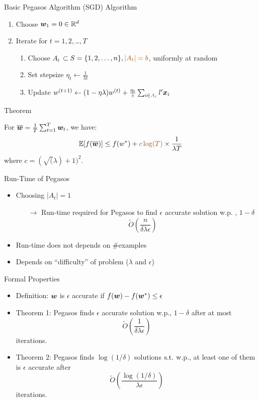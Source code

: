 \begin{frame}{Basic Pegasos Algorithm (SGD)}
    {\color{blue} Algorithm}

    \begin{enumerate} 
        \item Choose $\bm{w}_1 = 0 \in \mathbb{R}^d$
        \item Iterate for $t = 1,2,$\ldots$,T$
        \begin{enumerate}
            \item Choose {\color{red} $A_t$} $\subset S = \{1,2,\ldots,n\},{\color{red}|A_t|=b}$, uniformly at random
            \item Set stepsize $\eta_t \leftarrow \frac{1}{\lambda t}$
            \item Update $w^{(t+1)} \leftarrow (1-\eta\lambda)w^{(t)} + \frac{\eta_t}{\color{red}b} \sum_{i\in {\color{red} A_t}} l' \xv_i$
        \end{enumerate}
    \end{enumerate}

    {\color{blue} Theorem}

    For $\overline{\bm{w}} = \frac1T \sum_{t=1}^T \bm{w}_t $, we have:
    \[
        \E[f(\overline{\wv})]\le f(w^*) + {\color{red} c\log(T)}\times \frac{1}{\lambda T}
    \]
    where $c=(\sqrt(\lambda)+1)^2$.
\end{frame}

\begin{frame}{Run-Time of Pegasos}
    \begin{itemize}
        \item Choosing $|A_t|=1$%
            \begin{itemize}
                \item[$\rightarrow$] Run-time required for Pegasos to find $\epsilon$ accurate solution w.p. , $1-\delta$
            \[
                \tilde{O}(\frac{n}{\delta \lambda \epsilon})
            \]
            \end{itemize}
        \item Run-time does not depends on \#examples
        \item Depends on ``difficulty'' of problem ($\lambda$ and $\epsilon$)
    \end{itemize}
\end{frame}

\begin{frame}{Formal Properties}
    \begin{itemize}
        \item Definition: $\bm{w}$ is $\epsilon$ accurate if $f(\bm{w})-f(\bm{w}^*)\le \epsilon$
        \item Theorem 1: Pegasos finds $\epsilon$ accurate solution w.p., $1-\delta$ after at most
            \[
                \tilde{O}(\frac{1}{\delta \lambda \epsilon})
            \]
            iterations.
        \item Theorem 2: Pegasos finds $\log(1/\delta)$ solutions $\operatorname{\textrm{s.t.}}$ w.p., at least one of them is $\epsilon$ accurate after 
            \[
                \tilde{O}(\frac{\log(1/\delta)}{\lambda \epsilon})
            \]
            iterations.
    \end{itemize}
\end{frame}

